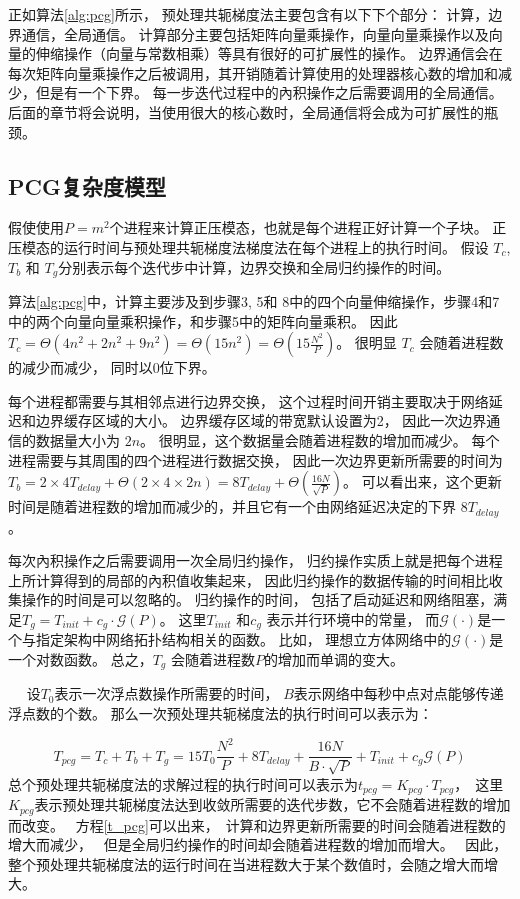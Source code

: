  
正如算法\ref{alg:pcg}所示， 预处理共轭梯度法主要包含有以下下个部分： 计算，边界通信，全局通信。
计算部分主要包括矩阵向量乘操作，向量向量乘操作以及向量的伸缩操作（向量与常数相乘）等具有很好的可扩展性的操作。 
边界通信会在每次矩阵向量乘操作之后被调用，其开销随着计算使用的处理器核心数的增加和减少，但是有一个下界。 
每一步迭代过程中的內积操作之后需要调用的全局通信。后面的章节将会说明，当使用很大的核心数时，全局通信将会成为可扩展性的瓶颈。
 
\subsection{PCG复杂度模型}
\label{solver:pcgComplex}
假使使用$P=m^2$个进程来计算正压模态，也就是每个进程正好计算一个子块。 
正压模态的运行时间与预处理共轭梯度法梯度法在每个进程上的执行时间。 
假设 $T_c$, $T_b$ 和 $T_g$分别表示每个迭代步中计算，边界交换和全局归约操作的时间。 

算法\ref{alg:pcg}中，计算主要涉及到步骤3, 5和 8中的四个向量伸缩操作，步骤4和7中的两个向量向量乘积操作，和步骤5中的矩阵向量乘积。 
因此 $T_c= \Theta (4 n^2 +2n^2+ 9n^2) = \Theta (15n^2) =\Theta(15\frac{N^2}{P})$。 
很明显 $T_c$ 会随着进程数的减少而减少， 同时以0位下界。 


每个进程都需要与其相邻点进行边界交换， 这个过程时间开销主要取决于网络延迟和边界缓存区域的大小。 
边界缓存区域的带宽默认设置为2， 因此一次边界通信的数据量大小为 $2n$。 
很明显，这个数据量会随着进程数的增加而减少。 
每个进程需要与其周围的四个进程进行数据交换， 因此一次边界更新所需要的时间为$T_b =2\times4T_{delay} +\Theta (2\times4\times 2n)=8T_{delay} +\Theta (\frac{16N}{\sqrt{P}})$。 
可以看出来，这个更新时间是随着进程数的增加而减少的，并且它有一个由网络延迟决定的下界 $8T_{delay}$。 

 
每次內积操作之后需要调用一次全局归约操作， 归约操作实质上就是把每个进程上所计算得到的局部的內积值收集起来，
因此归约操作的数据传输的时间相比收集操作的时间是可以忽略的。 
归约操作的时间， 包括了启动延迟和网络阻塞，满足$T_g= T_{init}+ c_g\cdot \mathcal{G}(P)$。 
这里$T_{init}$ 和$c_g$ 表示并行环境中的常量， 而$\mathcal{G}(\cdot)$是一个与指定架构中网络拓扑结构相关的函数。 
比如， 理想立方体网络中的$\mathcal{G}(\cdot)$是一个对数函数。 
总之，$T_g$ 会随着进程数$P$的增加而单调的变大。 
 

　
设$T_0$表示一次浮点数操作所需要的时间， $B$表示网络中每秒中点对点能够传递浮点数的个数。 
那么一次预处理共轭梯度法的执行时间可以表示为：

\begin{equation}
\label{t_pcg}
T_{pcg} = T_c + T_b + T_g
= 15 T_0\frac{N^2}{P} + 8T_{delay} + \frac{16N}{B\cdot\sqrt{P}}+T_{init} +c_g\mathcal{G}(P)
\end{equation}
总个预处理共轭梯度法的求解过程的执行时间可以表示为$t_{pcg} = K_{pcg}\cdot T_{pcg}$，　这里$K_{pcg}$表示预处理共轭梯度法达到收敛所需要的迭代步数，它不会随着进程数的增加而改变。　
方程\ref{t_pcg}可以出来，　计算和边界更新所需要的时间会随着进程数的增大而减少，　
但是全局归约操作的时间却会随着进程数的增加而增大。　
因此，整个预处理共轭梯度法的运行时间在当进程数大于某个数值时，会随之增大而增大。　

